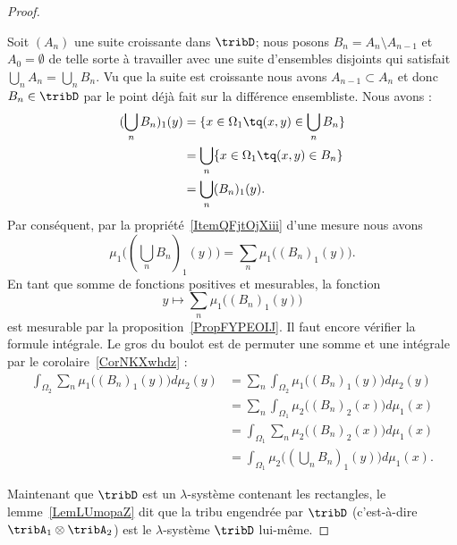 \begin{proof}
\begin{subproof}

														 Soit \( (A_n)\) une suite croissante dans \( \tribD\); nous posons \( B_n=A_n\setminus A_{n-1}\) et \( A_0=\emptyset\) de telle sorte à travailler avec une suite d'ensembles disjoints qui satisfait \( \bigcup_nA_n=\bigcup_nB_n\). Vu que la suite est croissante nous avons \( A_{n-1}\subset A_n\) et donc \( B_n\in\tribD\) par le point déjà fait sur la différence ensembliste. Nous avons :
														 \begin{subequations}
														 \begin{align}
														 (\bigcup_nB_n)_1(y) & =\{ x\in \Omega_1\tq (x,y)\in\bigcup_nB_n \} \\
																										& =\bigcup_n\{ x\in\Omega_1\tq (x,y)\in B_n \} \\
																										& =\bigcup_n (B_n)_1(y).
																										\end{align}
																										\end{subequations}
																										Par conséquent, par la propriété~\ref{ItemQFjtOjXiii} d'une mesure nous avons
																										\begin{equation}
																										\mu_1\big( (\bigcup_nB_n)_1(y) \big)=\sum_n\mu_1\big( (B_n)_1(y) \big).
																										\end{equation}
																										En tant que somme de fonctions positives et mesurables, la fonction
																										\begin{equation}
y\mapsto\sum_n\mu_1\big( (B_n)_1(y) \big)
	\end{equation}
	est mesurable par la proposition~\ref{PropFYPEOIJ}. Il faut encore vérifier la formule intégrale. Le gros du boulot est de permuter une somme et une intégrale par le corolaire~\ref{CorNKXwhdz} :
	\begin{subequations}
	\begin{align}
	\int_{\Omega_2}\sum_n\mu_1\big( (B_n)_1(y) \big)d\mu_2(y) & =\sum_n\int_{\Omega_2}\mu_1\big( (B_n)_1(y) \big)d\mu_2(y)     \\
		& =\sum_n\int_{\Omega_1}\mu_2\big( (B_n)_2(x) \big)d\mu_1(x)     \\
		& =\int_{\Omega_1}\sum_n\mu_2\big( (B_n)_2(x) \big)d\mu_1(x)     \\
		& =\int_{\Omega_1}\mu_2\big( (\bigcup_nB_n)_1(y) \big)d\mu_1(x).
		\end{align}
		\end{subequations}
		\end{subproof}
		Maintenant que \( \tribD\) est un \( \lambda\)-système contenant les rectangles, le lemme~\ref{LemLUmopaZ} dit que la tribu engendrée par \( \tribD\) (c'est-à-dire \( \tribA_1\otimes \tribA_2\)) est le \( \lambda\)-système \( \tribD\) lui-même.


\end{proof}
